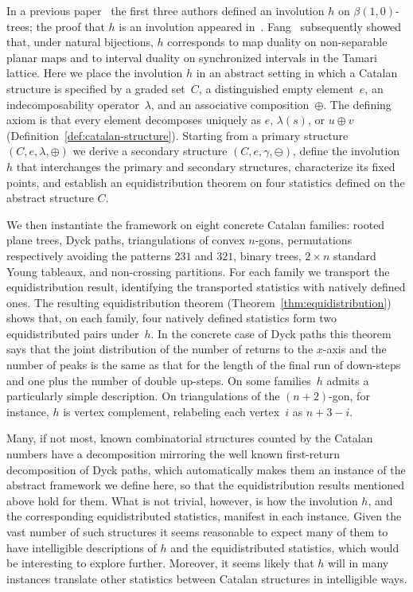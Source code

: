 \documentclass[a4paper,11pt]{article}
\theoremstyle{definition}
\begin{document}
In a previous paper~\cite{CKS09} the first three authors defined an involution
$h$ on $\beta(1,0)$-trees; the proof that $h$ is an involution appeared
in~\cite{CKS13}.  Fang~\cite{Fang18} subsequently showed that, under natural
bijections, $h$ corresponds to map duality on non-separable planar maps and to
interval duality on synchronized intervals in the Tamari lattice.  Here we place
the involution $h$ in an abstract setting in which a Catalan structure is
specified by a graded set~$C$, a distinguished empty element~$e$, an
indecomposability operator~$\lambda$, and an associative
composition~$\oplus$. The defining axiom is that every element decomposes
uniquely as $e$, $\lambda(s)$, or $u \oplus v$
(Definition~\ref{def:catalan-structure}). Starting from a primary structure
$(C, e, \lambda, \oplus)$ we derive a secondary structure
$(C,e,\gamma,\ominus)$, define the involution $h$ that interchanges the primary
and secondary structures, characterize its fixed points, and establish an
equidistribution theorem on four statistics defined on the abstract structure
$C$.

We then instantiate the framework on eight concrete Catalan families: rooted
plane trees, Dyck paths, triangulations of convex $n$-gons, permutations
respectively avoiding the patterns $231$ and $321$, binary trees, $2 \times n$
standard Young tableaux, and non-crossing partitions. For each family we
transport the equidistribution result, identifying the transported statistics
with natively defined ones. The resulting equidistribution theorem
(Theorem~\ref{thm:equidistribution}) shows that, on each family, four natively
defined statistics form two equidistributed pairs under~$h$. In the concrete
case of Dyck paths this theorem says that the joint distribution of the number
of returns to the $x$-axis and the number of peaks is the same as that for the
length of the final run of down-steps and one plus the number of double
up-steps.  On some families~$h$ admits a particularly simple description.
On triangulations of the $(n{+}2)$-gon, for instance, $h$ is vertex complement,
relabeling each vertex~$i$ as $n{+}3{-}i$.

Many, if not most, known combinatorial structures counted by the Catalan numbers
have a decomposition mirroring the well known first-return decomposition of Dyck
paths, which automatically makes them an instance of the abstract framework we
define here, so that the equidistribution results mentioned above hold for them.
What is not trivial, however, is how the involution $h$, and the
corresponding equidistributed statistics, manifest in each instance.  Given the
vast number of such structures it seems reasonable to expect many of them to
have intelligible descriptions of $h$ and the equidistributed statistics, which
would be interesting to explore further.  Moreover, it seems likely that $h$
will in many instances translate other statistics between Catalan structures in
intelligible ways.
\end{document}
